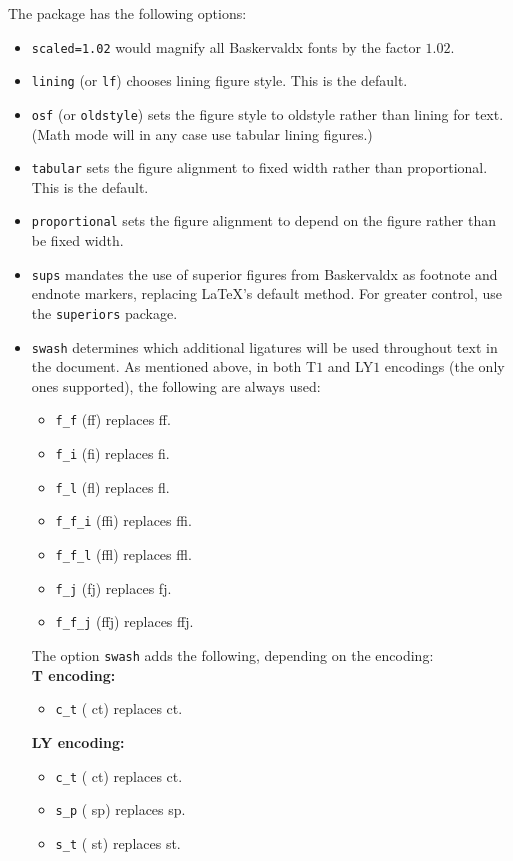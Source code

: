 \documentclass[11pt]{article}
\begin{document}
The package has the following options:
\begin{itemize}
\item
{\tt scaled=1.02} would magnify all Baskervaldx fonts by the factor $1.02$.
\item {\tt lining} (or {\tt lf}) chooses lining figure style. This is the default.
\item {\tt osf} (or {\tt oldstyle}) sets the figure style to oldstyle rather than lining for text. (Math mode will in any case use tabular lining figures.)
\item {\tt tabular} sets the figure alignment to fixed width rather than proportional. This is the default.
\item {\tt proportional} sets the figure alignment to depend on the figure rather than be fixed width. 
\item {\tt sups} mandates the use of superior figures from \textsf{Baskervaldx} as footnote and endnote markers, replacing \LaTeX's default method. For greater control, use the {\tt superiors} package.
\item {\tt swash} determines which additional ligatures will be used throughout text in the document. As mentioned above, in both T$1$ and LY$1$ encodings (the only ones supported), the following are always used:
\begin{itemize}
\item
\verb|f_f| (ff) replaces f{}f.
\item
\verb|f_i| (fi) replaces f{}i.
\item
\verb|f_l| (fl) replaces f{}l.
\item
\verb|f_f_i| (ffi) replaces f{}f{}i.
\item
\verb|f_f_l| (ffl) replaces f{}f{}l.
\item
\verb|f_j| (fj) replaces f{}j.
\item
\verb|f_f_j| (ffj) replaces f{}f{}j.
\end{itemize}
The option {\tt swash} adds the following, depending on the encoding:\\
\textbf{T encoding:}
\begin{itemize}
\item
\verb|c_t| ({ ct}) replaces c{}t.
\end{itemize}
\textbf{LY encoding:}
\begin{itemize}
\item
\verb|c_t| ({ ct}) replaces c{}t.
\item
\verb|s_p| ({ sp}) replaces s{}p.
\item
\verb|s_t| ({ st}) replaces s{}t.
\end{itemize}
\end{itemize}
\end{document}
